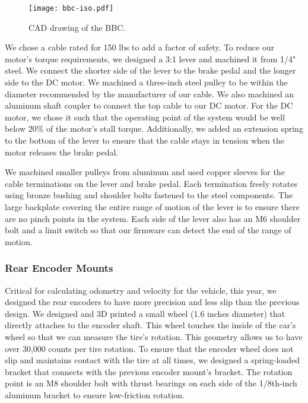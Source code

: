 \begin{figure}[ht!]
  \centering
  \texttt{[image: bbc-iso.pdf]}
  \caption{CAD drawing of the BBC.}
\end{figure}

We chose a cable rated for 150 lbs to add a factor of safety. To reduce
our motor's torque requirements, we designed a 3:1 lever and machined
it from 1/4" steel. We connect the shorter side of the lever to the
brake pedal and the longer side to the DC motor. We machined a
three-inch steel pulley to be within the diameter recommended by the
manufacturer of our cable. We also machined an aluminum shaft coupler
to connect the top cable to our DC motor. For the DC motor, we chose it
such that the operating point of the system would be well below 20\% of
the motor's stall torque. Additionally, we added an extension spring to
the bottom of the lever to ensure that the cable stays in tension when
the motor releases the brake pedal.

We machined smaller pulleys from aluminum and used copper sleeves for
the cable terminations on the lever and brake pedal. Each termination
freely rotates using bronze bushing and shoulder bolts fastened to the
steel components. The large backplate covering the entire range of
motion of the lever is to ensure there are no pinch points in the
system. Each side of the lever also has an M6 shoulder bolt and a limit
switch so that our firmware can detect the end of the range of motion.

\subsubsection{Rear Encoder Mounts}

Critical for calculating odometry and velocity for the vehicle, this
year, we designed the rear encoders to have more precision and less
slip than the previous design. We designed and 3D printed a small wheel
(1.6 inches diameter) that directly attaches to the encoder shaft. This
wheel touches the inside of the car’s wheel so that we can measure the
tire's rotation. This geometry allows us to have over 30,000 counts per
tire rotation. To ensure that the encoder wheel does not slip and
maintains contact with the tire at all times, we designed a
spring-loaded bracket that connects with the previous encoder mount’s
bracket. The rotation point is an M8 shoulder bolt with thrust bearings
on each side of the 1/8th-inch aluminum bracket to ensure low-friction
rotation.

